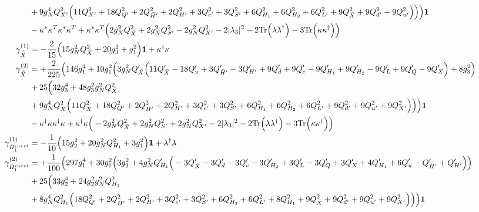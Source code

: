 {\begin{align}
 &+9 g_{N}^{4} Q_{X'}^{2} \Big(11 Q_{X'}^{2}  + 18 Q_{Q'}^{2}  + 2 Q_{\bar{H}'}^{2}  + 2 Q_{H'}^{2}  + 3 Q_{e'}^{2}  + 3 Q_{S'}^{2}  + 6 Q_{H_1}^{2}  + 6 Q_{H_2}^{2}  + 6 Q_{L'}^{2}  + 9 Q_{\bar{X}}^{2}  + 9 Q_{d'}^{2}  + 9 Q_{u'}^{2} \Big)\Big)\Big){\bf 1} \nonumber \\ 
 &- {\kappa^*  \kappa^{T}  \kappa^*  \kappa^{T}} +{\kappa^*  \kappa^{T}} \Big(2 g_{N}^{2} Q_{\bar{X}}^{2}  + 2 g_{N}^{2} Q_{S'}^{2}  -2 g_{N}^{2} Q_{X'}^{2}  -2 |\lambda_3|^2  -2 \mbox{Tr}\Big({\lambda  \lambda^{\dagger}}\Big)  -3 \mbox{Tr}\Big({\kappa  \kappa^{\dagger}}\Big) \Big)\\ 
\gamma_{\hat{\bar{X}}}^{(1)} & =  
-\frac{2}{15} \Big(15 g_{N}^{2} Q_{\bar{X}}^{2}  + 20 g_{3}^{2}  + g_{1}^{2}\Big){\bf 1}  + {\kappa^{\dagger}  \kappa}\\ 
\gamma_{\hat{\bar{X}}}^{(2)} & =  
+\frac{2}{225} \Big(146 g_{1}^{4} +10 g_{1}^{2} \Big(3 g_{N}^{2} Q_{\bar{X}}' \Big(11 Q_{\bar{X}}'  -18 Q_u'  + 3 Q_{\bar{H}'}'  -3 Q_{H'}'  + 9 Q_d'  + 9 Q_e'  -9 Q_{H_1}'  + 9 Q_{H_2}'  -9 Q_L'  + 9 Q_Q'  -9 Q_X' \Big) + 8 g_{3}^{2} \Big)\nonumber \\ 
 &+25 \Big(32 g_{3}^{4} +48 g_{3}^{2} g_{N}^{2} Q_{\bar{X}}^{2} \nonumber \\ 
 &+9 g_{N}^{4} Q_{\bar{X}}^{2} \Big(11 Q_{\bar{X}}^{2}  + 18 Q_{Q'}^{2}  + 2 Q_{\bar{H}'}^{2}  + 2 Q_{H'}^{2}  + 3 Q_{e'}^{2}  + 3 Q_{S'}^{2}  + 6 Q_{H_1}^{2}  + 6 Q_{H_2}^{2}  + 6 Q_{L'}^{2}  + 9 Q_{d'}^{2}  + 9 Q_{u'}^{2}  + 9 Q_{X'}^{2} \Big)\Big)\Big){\bf 1} \nonumber \\ 
 &- {\kappa^{\dagger}  \kappa  \kappa^{\dagger}  \kappa} +{\kappa^{\dagger}  \kappa} \Big(-2 g_{N}^{2} Q_{\bar{X}}^{2}  + 2 g_{N}^{2} Q_{S'}^{2}  + 2 g_{N}^{2} Q_{X'}^{2}  -2 |\lambda_3|^2  -2 \mbox{Tr}\Big({\lambda  \lambda^{\dagger}}\Big)  -3 \mbox{Tr}\Big({\kappa  \kappa^{\dagger}}\Big) \Big)\\ 
\gamma_{\hat{H}^{inert}_{1}}^{(1)} & =  
-\frac{1}{10} \Big(15 g_{2}^{2}  + 20 g_{N}^{2} Q_{H_1}^{2}  + 3 g_{1}^{2} \Big){\bf 1}  + {\lambda^{\dagger}  \lambda}\\ 
\gamma_{\hat{H}^{inert}_{1}}^{(2)} & =  
+\frac{1}{100} \Big(297 g_{1}^{4} +30 g_{1}^{2} \Big(3 g_{2}^{2}  + 4 g_{N}^{2} Q_{H_1}' \Big(-3 Q_{\bar{X}}'  -3 Q_d'  -3 Q_e'  -3 Q_{H_2}'  + 3 Q_L'  -3 Q_Q'  + 3 Q_X'  + 4 Q_{H_1}'  + 6 Q_u'  - Q_{\bar{H}'}'  + Q_{H'}'\Big)\Big)\nonumber \\ 
 &+25 \Big(33 g_{2}^{4} +24 g_{2}^{2} g_{N}^{2} Q_{H_1}^{2} \nonumber \\ 
 &+8 g_{N}^{4} Q_{H_1}^{2} \Big(18 Q_{Q'}^{2}  + 2 Q_{\bar{H}'}^{2}  + 2 Q_{H'}^{2}  + 3 Q_{e'}^{2}  + 3 Q_{S'}^{2}  + 6 Q_{H_2}^{2}  + 6 Q_{L'}^{2}  + 8 Q_{H_1}^{2}  + 9 Q_{\bar{X}}^{2}  + 9 Q_{d'}^{2}  + 9 Q_{u'}^{2}  + 9 Q_{X'}^{2} \Big)\Big)\Big){\bf 1} \nonumber \\ 

\end{align}}
